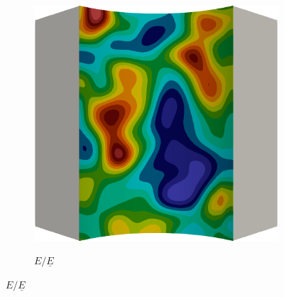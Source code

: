 \begin{frame}
\begin{columns}[T]
\begin{column}{0.6\textwidth}
\begin{figure}
{          \begin{subfigure}{0.25\textwidth}
            \centering
            \includegraphics[width=\textwidth]{Chapter345/figures/E.0000}
          \end{subfigure}
          \begin{subfigure}{0.1\textwidth}
            \centering
            \caption*{$E/\underline{E}$}

\end{subfigure}}
\end{figure}
\end{column}
\end{columns}
\end{frame}
